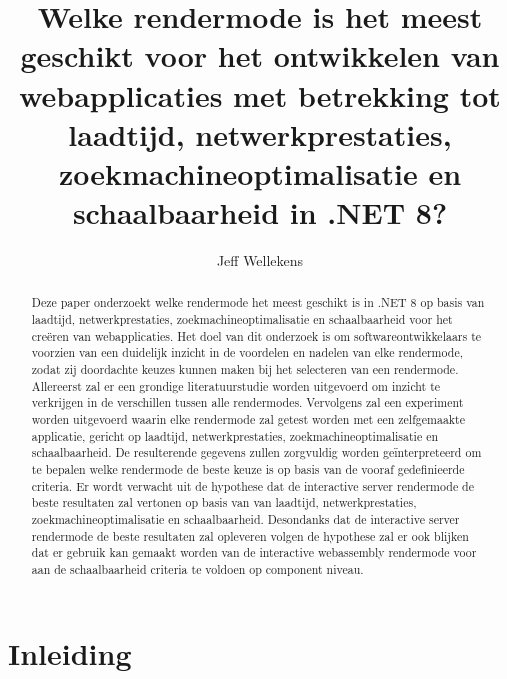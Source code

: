\documentclass{hogent-article}
\title{Welke rendermode is het meest geschikt voor het ontwikkelen van webapplicaties met betrekking tot laadtijd, netwerkprestaties, zoekmachineoptimalisatie en schaalbaarheid in .NET 8?}
\author{Jeff Wellekens}
\begin{document}
\begin{abstract}
  Deze paper onderzoekt welke rendermode het meest geschikt is in .NET 8 op basis
  van laadtijd, netwerkprestaties, zoekmachineoptimalisatie en schaalbaarheid voor het creëren van webapplicaties. 
  Het doel van dit onderzoek is om softwareontwikkelaars te voorzien van een duidelijk inzicht in de voordelen en nadelen van
  elke rendermode, zodat zij doordachte keuzes kunnen maken bij het selecteren van een rendermode. Allereerst zal er een grondige literatuurstudie 
  worden uitgevoerd om inzicht te verkrijgen in de verschillen tussen alle rendermodes. 
  Vervolgens zal een experiment worden uitgevoerd waarin elke rendermode zal getest worden met een zelfgemaakte applicatie, gericht op laadtijd, netwerkprestaties, zoekmachineoptimalisatie en schaalbaarheid.
  De resulterende gegevens zullen zorgvuldig worden geïnterpreteerd om te bepalen welke rendermode de beste keuze is op basis van de vooraf gedefinieerde criteria. 
  Er wordt verwacht uit de hypothese dat de interactive server rendermode de beste resultaten zal vertonen op basis van van laadtijd, netwerkprestaties, zoekmachineoptimalisatie en schaalbaarheid. Desondanks
  dat de interactive server rendermode de beste resultaten zal opleveren volgen de hypothese zal er ook blijken dat er gebruik kan gemaakt worden van de interactive webassembly rendermode voor aan
  de schaalbaarheid criteria te voldoen op component niveau. 
\end{abstract}

\tableofcontents

\bigskip





\section{Inleiding}%
\label{sec:inleiding}
\end{document}
